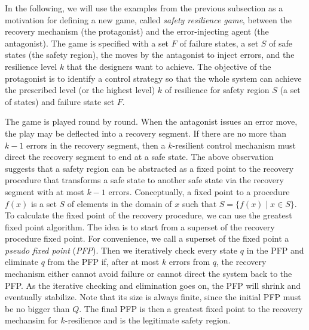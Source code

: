 \documentclass[times,10pt,twocolumn]{article}
\begin{document}
In the following, we will use the examples from the previous subsection 
as a motivation for defining a new game, called {\em safety resilience game}, 
between the recovery mechanism (the protagonist) 
and the error-injecting agent (the antagonist).  
\label{reply2.S.F}
The game is specified with a set $F$ of failure states, 
a set $S$ of safe states (the safety region), the 
moves by the antagonist to inject errors, 
and the resilience level $k$ that the designers want to achieve. 
The objective of the protagonist is to identify a control strategy 
so that the whole system can achieve the prescribed level (or 
the highest level) $k$ of resilience for safety region $S$ (a set of states) 
and failure state set $F$.  

The game is played round by round. 
When the antagonist issues an error move, 
the play may be deflected into a recovery segment.  
If there are no more than $k-1$ errors in the recovery segment, 
then a $k$-resilient control mechanism must direct the recovery segment
to end at a safe state. 
The above observation suggests that 
a safety region can be abstracted as a fixed point 
to the recovery procedure 
that transforms a safe state to another safe state via the recovery segment 
with at most $k-1$ errors. 
\label{reply1.fixed.point.explanation} 
Conceptually, a fixed point to a procedure $f(x)$ is a set $S$ of elements 
in the domain of $x$ such that $S=\{f(x)\mid x\in S\}$.  
To calculate the fixed point of the recovery procedure, 
we can use the greatest fixed point algorithm.  
The idea is to start from a superset of the recovery procedure fixed point. 
For convenience, we call a superset of the fixed point a {\em pseudo fixed point} 
({\em PFP}).  
Then we iteratively check every state $q$ in the PFP and eliminate 
$q$ from the PFP if, after at most $k$ errors from $q$, 
the recovery mechanism either cannot avoid failure or 
cannot direct the system back to the PFP. 
As the iterative checking and elimination goes on, 
the PFP will shrink and eventually stabilize.
Note that its size is always finite, 
since the initial PFP must be no bigger than $Q$.  
The final PFP is then a greatest fixed point to the recovery mechansim for 
$k$-resilience and is the legitimate safety region.  
 
\end{document}
